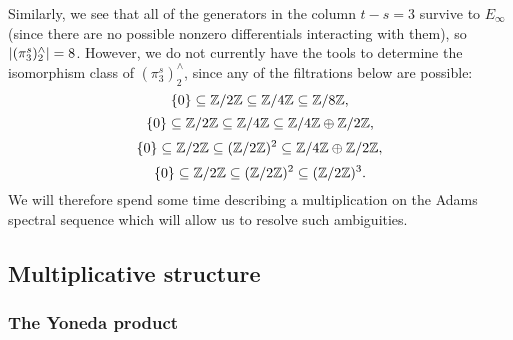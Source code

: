 \documentclass[11pt, titlepage]{article} %
\def\subq{\ensuremath\subseteq}
\def\inte{\ensuremath\mathbb{Z}}
\numberwithin{equation}{subsection}
\theoremstyle{plain}
\theoremstyle{definition}
\begin{document}
Similarly, we see that all of the generators in the column \(t-s=3\) survive to \(E_\infty\) (since there are no possible nonzero differentials interacting with them), so \(\lvert(\pi_3^s)^\wedge_2\rvert=8\). However, we do not currently have the tools to determine the isomorphism class of \((\pi_3^s)^\wedge_2\), since any of the filtrations below are possible:
\[\{0\}\subq \inte/2\inte\subq \inte/4\inte\subq \inte/8\inte,\]
\[\{0\}\subq \inte/2\inte\subq \inte/4\inte\subq \inte/4\inte\oplus \inte/2\inte,\]
\[\{0\}\subq \inte/2\inte\subq (\inte/2\inte)^2\subq \inte/4\inte\oplus \inte/2\inte,\]
\[\{0\}\subq \inte/2\inte\subq (\inte/2\inte)^2\subq (\inte/2\inte)^3.\]
We will therefore spend some time describing a multiplication on the Adams spectral sequence which will allow us to resolve such ambiguities.

\subsection{Multiplicative structure}\label{2504291250}

\subsubsection{The Yoneda product}\label{2504171922}
\end{document}
